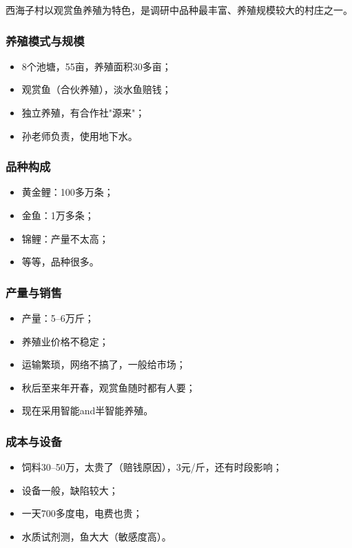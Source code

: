 \documentclass[12pt,a4paper]{article}
\begin{document}
西海子村以观赏鱼养殖为特色，是调研中品种最丰富、养殖规模较大的村庄之一。

\subsubsection{养殖模式与规模}

\begin{itemize}[leftmargin=2em]
    \item 8个池塘，55亩，养殖面积30多亩；
    \item 观赏鱼（合伙养殖），淡水鱼赔钱；
    \item 独立养殖，有合作社"源来"；
    \item 孙老师负责，使用地下水。
\end{itemize}

\subsubsection{品种构成}

\begin{itemize}[leftmargin=2em]
    \item 黄金鲤：100多万条；
    \item 金鱼：1万多条；
    \item 锦鲤：产量不太高；
    \item 等等，品种很多。
\end{itemize}

\subsubsection{产量与销售}

\begin{itemize}[leftmargin=2em]
    \item 产量：5--6万斤；
    \item 养殖业价格不稳定；
    \item 运输繁琐，网络不搞了，一般给市场；
    \item 秋后至来年开春，观赏鱼随时都有人要；
    \item 现在采用智能and半智能养殖。
\end{itemize}

\subsubsection{成本与设备}

\begin{itemize}[leftmargin=2em]
    \item 饲料30--50万，太贵了（赔钱原因），3元/斤，还有时段影响；
    \item 设备一般，缺陷较大；
    \item 一天700多度电，电费也贵；
    \item 水质试剂测，鱼大大（敏感度高）。
\end{itemize}
\end{document}
